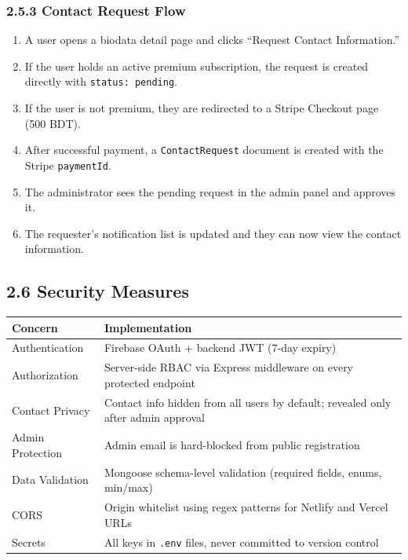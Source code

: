 \documentclass[conference]{IEEEtran}
\begin{document}
\subsubsection*{2.5.3 Contact Request Flow}
\begin{enumerate}
    \item A user opens a biodata detail page and clicks ``Request Contact Information.''
    \item If the user holds an active premium subscription, the request is created directly with \texttt{status: pending}.
    \item If the user is not premium, they are redirected to a Stripe Checkout page (500 BDT).
    \item After successful payment, a \texttt{ContactRequest} document is created with the Stripe \texttt{paymentId}.
    \item The administrator sees the pending request in the admin panel and approves it.
    \item The requester's notification list is updated and they can now view the contact information.
\end{enumerate}

\subsection*{2.6 Security Measures}

\begin{table}[htbp]
\centering
\footnotesize
\renewcommand{\arraystretch}{1.3}
\begin{tabularx}{\columnwidth}{|l|X|}
\hline
\textbf{Concern} & \textbf{Implementation} \\ \hline
Authentication & Firebase OAuth + backend JWT (7-day expiry) \\ \hline
Authorization & Server-side RBAC via Express middleware on every protected endpoint \\ \hline
Contact Privacy & Contact info hidden from all users by default; revealed only after admin approval \\ \hline
Admin Protection & Admin email is hard-blocked from public registration \\ \hline
Data Validation & Mongoose schema-level validation (required fields, enums, min/max) \\ \hline
CORS & Origin whitelist using regex patterns for Netlify and Vercel URLs \\ \hline
Secrets & All keys in \texttt{.env} files, never committed to version control \\ \hline
\end{tabularx}
\end{table}
\end{document}
